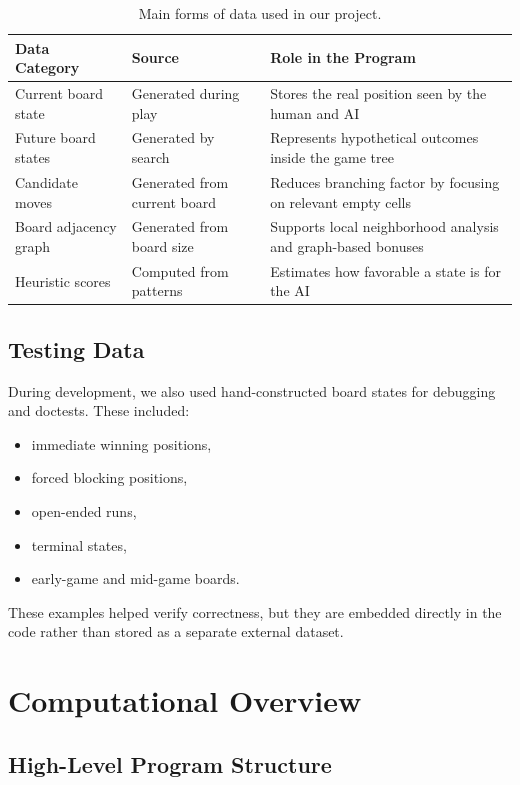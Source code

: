 \documentclass[11pt]{article}
\begin{document}
\begin{table}[H]
\centering
\small
\begin{tabularx}{\textwidth}{|P{3.0cm}|P{2.8cm}|Y|}
\hline
\textbf{Data Category} & \textbf{Source} & \textbf{Role in the Program} \\
\hline
Current board state & Generated during play & Stores the real position seen by the human and AI \\
\hline
Future board states & Generated by search & Represents hypothetical outcomes inside the game tree \\
\hline
Candidate moves & Generated from current board & Reduces branching factor by focusing on relevant empty cells \\
\hline
Board adjacency graph & Generated from board size & Supports local neighborhood analysis and graph-based bonuses \\
\hline
Heuristic scores & Computed from patterns & Estimates how favorable a state is for the AI \\
\hline
\end{tabularx}
\caption{Main forms of data used in our project.}
\end{table}

\subsection*{Testing Data}

During development, we also used hand-constructed board states for debugging and doctests. These included:
\begin{itemize}
    \item immediate winning positions,
    \item forced blocking positions,
    \item open-ended runs,
    \item terminal states,
    \item early-game and mid-game boards.
\end{itemize}

These examples helped verify correctness, but they are embedded directly in the code rather than stored as a separate external dataset.

\section*{Computational Overview}

\subsection*{High-Level Program Structure}
\end{document}
